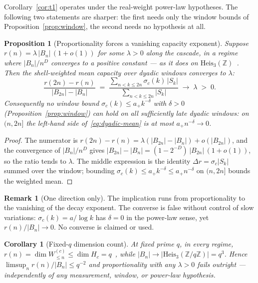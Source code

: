 \documentclass[11pt,a4paper]{article}
\newtheorem{proposition}[theorem]{Proposition}
\newtheorem{corollary}[theorem]{Corollary}
\theoremstyle{definition}
\newtheorem{remark}[theorem]{Remark}
\newcommand{\Heis}{\mathrm{Heis}_3(\mathbb{Z})}
\newcommand{\Heisq}{\mathrm{Heis}_3(\mathbb{Z}/q\mathbb{Z})}
\begin{document}
Corollary~\ref{cor:t1} operates under the real-weight power-law hypotheses.
The following two statements are sharper: the first needs only the window bounds of
Proposition~\ref{prop:window}, the second needs no hypothesis at all.

\begin{proposition}[Proportionality forces a vanishing capacity exponent]
  \label{prop:t1}
  Suppose $r(n) = \lambda\, |B_n|\,(1 + o(1))$ for some $\lambda > 0$ along the cascade, in a regime where
  $|B_n|/n^D$ converges to a positive constant --- as it does on $\Heis$~\cite{Pansu1983}.
  Then the shell-weighted mean capacity over dyadic windows converges to $\lambda$:
  \begin{equation}
    \label{eq:dyadic-mean}
    \frac{r(2n) - r(n)}{|B_{2n}| - |B_n|}
    \;=\;
    \frac{\sum_{n < k \le 2n} \sigma_c(k)\,|S_k|}{\sum_{n < k \le 2n} |S_k|}
    \;\longrightarrow\; \lambda \;>\; 0 .
  \end{equation}
  Consequently no window bound $\sigma_c(k) \le a_+ k^{-\delta}$ with $\delta > 0$
  (Proposition~\ref{prop:window}) can hold on all sufficiently late dyadic windows: on $(n, 2n]$ the
  left-hand side of~\eqref{eq:dyadic-mean} is at most $a_+ n^{-\delta} \to 0$.
\end{proposition}

\begin{proof}
  The numerator is $r(2n) - r(n) = \lambda(|B_{2n}| - |B_n|) + o(|B_{2n}|)$, and the convergence of
  $|B_n|/n^D$ gives $|B_{2n}| - |B_n| = (1 - 2^{-D})\,|B_{2n}|\,(1 + o(1))$, so the ratio tends to
  $\lambda$.
  The middle expression is the identity $\Delta r = \sigma_c |S_k|$ summed over the window; bounding
  $\sigma_c(k) \le a_+ k^{-\delta} \le a_+ n^{-\delta}$ on $(n, 2n]$ bounds the weighted mean.
\end{proof}

\begin{remark}[One direction only]
  \label{rem:one-direction}
  The implication runs from proportionality to the vanishing of the decay exponent.
  The converse is false without control of slow variations: $\sigma_c(k) = a/\log k$ has $\delta = 0$ in
  the power-law sense, yet $r(n)/|B_n| \to 0$.
  No converse is claimed or used.
\end{remark}

\begin{corollary}[Fixed-$q$ dimension count]
  \label{cor:dimcount}
  At fixed prime $q$, in every regime, $r(n) = \dim W_{\le n}^{(c)} \le \dim H_c = q$~\cite{Beau2026a16},
  while $|B_n| \to |\Heisq| = q^3$.
  Hence $\limsup_n r(n)/|B_n| \le q^{-2}$ and proportionality with any $\lambda > 0$ fails outright ---
  independently of any measurement, window, or power-law hypothesis.
\end{corollary}
\end{document}
